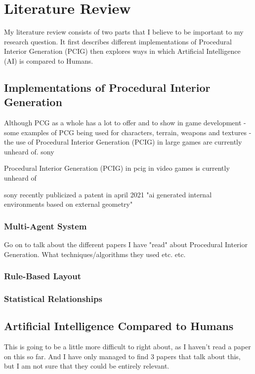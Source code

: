 \section{Literature Review}
My literature review consists of two parts that I believe to be important to my research question.
It first describes different implementations of Procedural Interior Generation (PCIG) then explores
ways in which Artificial Intelligence (AI) is compared to Humans.
\\
\subsection{Implementations of Procedural Interior Generation}
Although PCG as a whole has a lot to offer and to show in game development - some examples of PCG being used for
characters, terrain, weapons and textures - the use of Procedural Interior Generation (PCIG) in large games are currently unheard of.
sony \cite{sony-patent}


Procedural Interior Generation (PCIG) in 
pcig in video games is currently unheard of

sony recently publicized a patent in april 2021
"ai generated internal environments based on external geometry"

\subsubsection*{Multi-Agent System}
Go on to talk about the different papers I have "read" about Procedural Interior Generation.
What techniques/algorithms they used etc. etc. \cite{real-time-walkthroughs}
\subsubsection*{Rule-Based Layout}
\subsubsection*{Statistical Relationships}


\subsection{Artificial Intelligence Compared to Humans}
This is going to be a little more difficult to right about, as I haven't read a paper on this so far.
And I have only managed to find 3 papers that talk about this, but I am not sure that they could be entirely relevant.